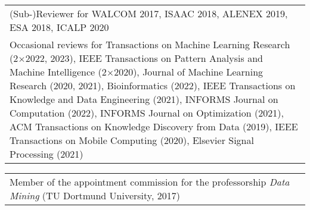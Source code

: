 \documentclass[10pt, a4paper, DIV=12, headings=small]{scrartcl}
\begin{document}
\begin{tabular}{p{14.5cm}}
	(Sub-)Reviewer for WALCOM 2017, ISAAC 2018, ALENEX 2019, ESA 2018, ICALP 2020                                                                                                                                                                                                                                                                                                                                                                                                                                                                                                                                                                                                                                                                                                                                                                                                                            \\[0.2em]

	Occasional reviews for Transactions on Machine Learning Research (2$\times$2022, 2023), IEEE Transactions on Pattern Analysis and Machine Intelligence (2$\times$2020), Journal of Machine Learning Research (2020, 2021), Bioinformatics (2022), IEEE Transactions on Knowledge and Data Engineering (2021), INFORMS Journal on Computation (2022), INFORMS Journal on Optimization (2021), ACM Transactions on Knowledge Discovery from Data (2019), IEEE Transactions on Mobile Computing (2020), Elsevier Signal Processing (2021)                                                                                                                                                                                                                                                                                                                                                                         \\
\end{tabular}

\begin{tabular}{p{14.5cm}}
	Member of the appointment commission for the professorship \emph{Data Mining} (TU Dortmund University, 2017)
\end{tabular}
\end{document}
